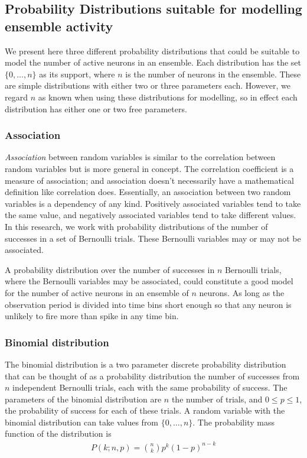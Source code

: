     \subsection{Probability Distributions suitable for modelling ensemble activity}

    We present here three different probability distributions that could be suitable to model the number of active neurons in an ensemble. Each distribution has the set $\lbrace 0, \dots, n \rbrace$ as its support, where $n$ is the number of neurons in the ensemble. These are simple distributions with either two or three parameters each. However, we regard $n$ as known when using these distributions for modelling, so in effect each distribution has either one or two free parameters.

      \subsubsection{Association}\label{sec:association}
      \textit{Association} between random variables is similar to the correlation between random variables but is more general in concept. The correlation coefficient is a measure of association; and association doesn't necessarily have a mathematical definition like correlation does. Essentially, an association between two random variables is a dependency of any kind. Positively associated variables tend to take the same value, and negatively associated variables tend to take different values. In this research, we work with probability distributions of the number of successes in a set of Bernoulli trials. These Bernoulli variables may or may not be associated.

      A probability distribution over the number of successes in $n$ Bernoulli trials, where the Bernoulli variables may be associated, could constitute a good model for the number of active neurons in an ensemble of $n$ neurons. As long as the observation period is divided into time bins short enough so that any neuron is unlikely to fire more than spike in any time bin.

      \subsubsection{Binomial distribution}
      The binomial distribution is a two parameter discrete probability distribution that can be thought of as a probability distribution the number of successes from $n$ independent Bernoulli trials, each with the same probability of success. The parameters of the binomial distribution are $n$ the number of trials, and $0 \leq p \leq 1$, the probability of success for each of these trials. A random variable with the binomial distribution can take values from $\lbrace 0, \dots, n \rbrace$. The probability mass function of the distribution is
      \begin{align}\label{eq:binomial_pmf}
        P(k;n,p) = \binom{n}{k} p^k (1-p)^{n-k}
      \end{align}


